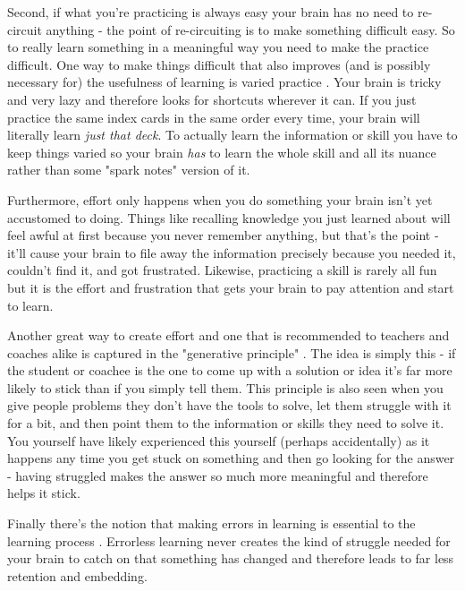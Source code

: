 \documentclass[11pt]{book}
\begin{document}
Second, if what you're practicing is always easy your brain has no need to re-circuit anything - the point of re-circuiting is to make something difficult easy. So to really learn something in a meaningful way you need to make the practice difficult. One way to make things difficult that also improves (and is possibly necessary for) the usefulness of learning is varied practice \cite{stick} \cite{ericsson}. Your brain is tricky and very lazy and therefore looks for shortcuts wherever it can. If you just practice the same index cards in the same order every time, your brain will literally learn \textit{just that deck}. To actually learn the information or skill you have to keep things varied so your brain \textit{has} to learn the whole skill and all its nuance rather than some "spark notes" version of it.
\newline

Furthermore, effort only happens when you do something your brain isn't yet accustomed to doing. Things like recalling knowledge you just learned about will feel awful at first because you never remember anything, but that's the point - it'll cause your brain to file away the information precisely because you needed it, couldn't find it, and got frustrated. Likewise, practicing a skill is rarely all fun but it is the effort and frustration that gets your brain to pay attention and start to learn. 
\newline

Another great way to create effort and one that is recommended to teachers and coaches alike is captured in the "generative principle" \cite{stick} \cite{stanier} \cite{coactive}. The idea is simply this - if the student or coachee is the one to come up with a solution or idea it's far more likely to stick than if you simply tell them. This principle is also seen when you give people problems they don't have the tools to solve, let them struggle with it for a bit, and then point them to the information or skills they need to solve it. You yourself have likely experienced this yourself (perhaps accidentally) as it happens any time you get stuck on something and then go looking for the answer - having struggled makes the answer so much more meaningful and therefore helps it stick.
\newline

Finally there's the notion that making errors in learning is essential to the learning process \cite{stick}. Errorless learning never creates the kind of struggle needed for your brain to catch on that something has changed and therefore leads to far less retention and embedding.
\newline
\end{document}
